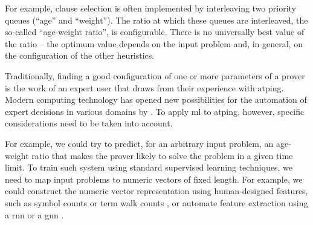 For example, clause selection is often implemented by interleaving two priority queues (\enquote{age} and \enquote{weight}).
The ratio at which these queues are interleaved, the so-called \enquote{age-weight ratio}, is configurable.
There is no universally best value of the ratio --
the optimum value depends on the input problem
\cite{DBLP:conf/cade/SchulzM16}
and, in general, on the configuration of the other heuristics.

Traditionally, finding a good configuration of one or more parameters of a prover is the work of an expert user that draws from their experience with \gls{atping}.
Modern computing technology has opened new possibilities for the automation of expert decisions in various domains by  \cite{DBLP:books/lib/HastieTF09,DBLP:journals/nn/Schmidhuber15}.
To apply \gls{ml} to \gls{atping}, however, specific considerations need to be taken into account.


For example, we could try to predict, for an arbitrary input problem, an age-weight ratio
that makes the prover likely to solve the problem in a given time limit.
To train such system using standard supervised learning techniques,
we need to map input problems to numeric vectors of fixed length.
For example, we could construct the numeric vector representation using human-designed features,
such as symbol counts or term walk counts \cite{DBLP:conf/mkm/JakubuvU17},
or automate feature extraction using a \gls{rnn} \cite{DBLP:conf/cade/ChvalovskyJ0U19,DBLP:conf/iclr/EvansSAKG18} or a \gls{gnn} \cite{DBLP:conf/cade/JakubuvCOP0U20}.

